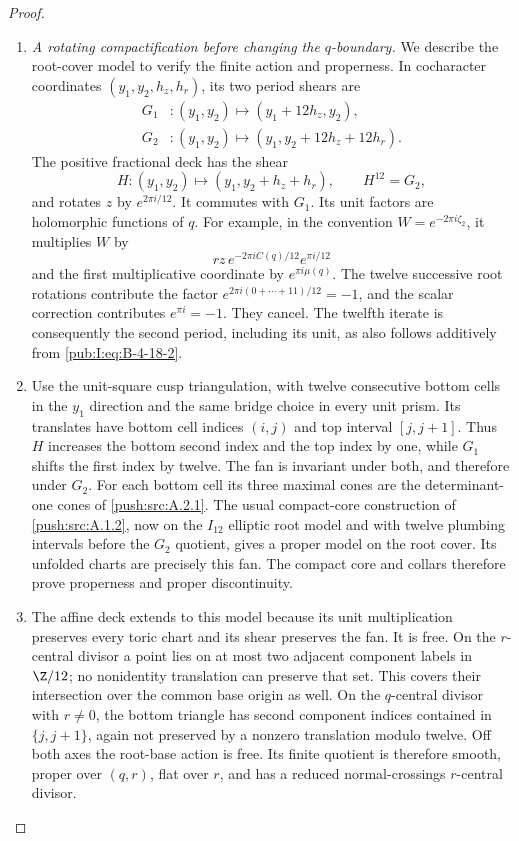 \begin{proof}
\begin{enumerate}[label=\arabic*.,leftmargin=*]
\item \emph{A rotating compactification before changing the
$q$-boundary.}
We describe the root-cover model to verify the finite
action and properness. In cocharacter coordinates
$(y_1,y_2,h_z,h_r)$, its two period shears are
\[
 \begin{aligned}
 G_1 &: (y_1,y_2)\longmapsto(y_1+12h_z,y_2),\\
 G_2 &: (y_1,y_2)\longmapsto
                         (y_1,y_2+12h_z+12h_r).
 \end{aligned}
\]
The positive fractional deck has the shear
\begin{equation}
 H:(y_1,y_2)\longmapsto(y_1,y_2+h_z+h_r),
 \qquad H^{12}=G_2,
\label{pub:I:eq:B-4-18-5}
\end{equation}
and rotates $z$ by $e^{2\pi i/12}$.
It commutes with $G_1$. Its unit factors are holomorphic
functions of $q$. For example, in the convention
$W=e^{-2\pi i\zeta_2}$, it multiplies $W$ by
\[
 r z\,e^{-2\pi i C(q)/12}e^{\pi i/12}
\]
and the first multiplicative coordinate by
$e^{\pi i\mu(q)}$. The twelve successive root rotations
contribute the factor
$e^{2\pi i(0+\cdots+11)/12}=-1$, and the scalar
correction contributes $e^{\pi i}=-1$.
They cancel. The twelfth iterate is consequently
the second period, including its unit, as
also follows additively from \eqref{pub:I:eq:B-4-18-2}.

\item Use the unit-square cusp triangulation, with twelve
consecutive bottom cells in the $y_1$ direction and
the same bridge choice in every unit prism. Its
translates have bottom cell indices $(i,j)$ and top
interval $[j,j+1]$. Thus $H$ increases the bottom
second index and the top index by one, while $G_1$
shifts the first index by twelve. The fan is invariant
under both, and therefore under $G_2$.
For each bottom cell its three maximal cones are
the determinant-one cones of \ref{push:src:A.2.1}. The usual
compact-core construction of \ref{push:src:A.1.2}, now on the
$I_{12}$ elliptic root model and with twelve
plumbing intervals before the $G_2$ quotient,
gives a proper model on the root cover. Its
unfolded charts are precisely this fan. The compact core and collars therefore prove properness and
proper discontinuity.

\item The affine deck extends to this model because its
unit multiplication preserves every toric chart
and its shear preserves the fan. It is free.
On the $r$-central divisor a point lies on at most
two adjacent component labels in $\Z/12$; no
nonidentity translation can preserve that set.
This covers their intersection over the common
base origin as well. On the $q$-central divisor
with $r\ne0$, the bottom triangle has second
component indices contained in $\{j,j+1\}$,
again not preserved by a nonzero translation
modulo twelve. Off both axes the root-base action
is free. Its finite quotient is therefore smooth,
proper over $(q,r)$, flat over $r$, and has a
reduced normal-crossings $r$-central divisor.


\end{enumerate}
\end{proof}
